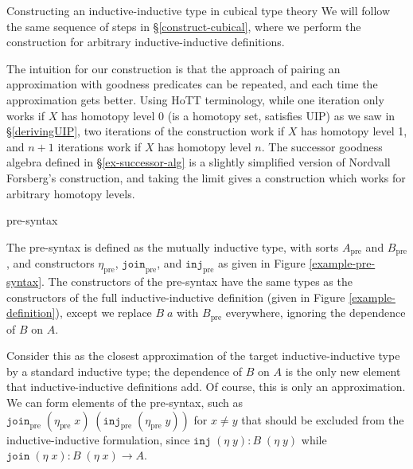 \documentclass[acmsmall,review]{acmart}\settopmatter{printfolios=true,printccs=false,printacmref=false}
\newcommand{\pre}[1]{{#1}_\text{pre}}
\newcommand{\join}{\texttt{join}}
\newcommand{\inj}{\texttt{inj}}
\def\Forsberg/{Nordvall Forsberg}
\begin{document}
\begin{section}{Constructing an inductive-inductive type in cubical type theory}
We will follow the same sequence of steps in \S\ref{construct-cubical}, where we perform the construction for arbitrary inductive-inductive definitions.

The intuition for our construction is that the approach of pairing an approximation with goodness predicates can be repeated, and each time the approximation gets better. Using HoTT terminology, while one iteration only works if $X$ has homotopy level 0 (is a homotopy set, satisfies UIP) as we saw in \S\ref{derivingUIP}, two iterations of the construction work if $X$ has homotopy level 1, and $n+1$ iterations work if $X$ has homotopy level $n$. The successor goodness algebra defined in \S\ref{ex-successor-alg} is a slightly simplified version of \Forsberg/'s construction, and taking the limit gives a construction which works for arbitrary homotopy levels.

\begin{subsection}{pre-syntax}\label{ex-pre-syntax}

The pre-syntax is defined as the mutually inductive type, with sorts $\pre{A}$ and $\pre{B}$, and constructors $\pre{\eta}$, $\pre{\join}$, and $\pre{\inj}$ as given in Figure \ref{example-pre-syntax}. The constructors of the pre-syntax have the same types as the constructors of the full inductive-inductive definition (given in Figure \ref{example-definition}), except we replace $B\;a$ with $\pre{B}$ everywhere, ignoring the dependence of $B$ on $A$.

Consider this as the closest approximation of the target inductive-inductive type by a standard inductive type; the dependence of $B$ on $A$ is the only new element that inductive-inductive definitions add. Of course, this is only an approximation. We can form elements of the pre-syntax, such as $\pre{\join}\;(\pre{\eta}\;x)\;(\pre{\inj}\;(\pre{\eta}\;y))$ for $x \neq y$ that should be excluded from the inductive-inductive formulation, since $\inj\;(\eta\;y) : B\;(\eta\;y)$ while $\join\;(\eta\;x) : B\;(\eta\;x) \to A$.


\end{subsection}
\end{section}
\end{document}
